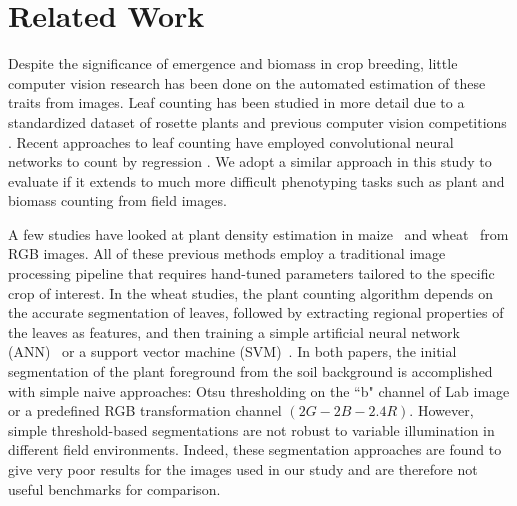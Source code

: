 \documentclass[10pt,twocolumn,letterpaper]{article}
\begin{document}
\section{Related Work}
\label{sec:rw}

Despite the significance of emergence and biomass in crop breeding, little computer vision research has been done on the automated estimation of these traits from images. Leaf counting has been studied in more detail due to a standardized dataset of rosette plants and previous computer vision competitions \cite{lcc-2017}. Recent approaches to leaf counting have employed convolutional neural networks to count by regression \cite{aich-cvppp2017}. We adopt a similar approach in this study to evaluate if it extends to much more difficult phenotyping tasks such as plant and biomass counting from field images.


A few studies have looked at plant density estimation in maize~\cite{steward2001, steward2004, steward2005} and wheat~\cite{wheat-ann-2017, jin2017} from RGB images. All of these previous methods employ a traditional image processing pipeline that requires hand-tuned parameters tailored to the specific crop of interest.
In the wheat studies, the plant counting algorithm depends on the accurate segmentation of leaves, followed by extracting regional properties of the leaves as features, and then training a simple artificial neural network (ANN)~\cite{wheat-ann-2017} or a support vector machine (SVM)~\cite{jin2017}. In both papers, the initial segmentation of the plant foreground from the soil background is accomplished with simple naive approaches: Otsu thresholding on the ``b" channel of Lab image or a predefined RGB transformation channel $(2G-2B-2.4R)$. However, simple threshold-based segmentations are not robust to variable illumination in different field environments. Indeed, these segmentation approaches are found to give very poor results for the images used in our study and are therefore not useful benchmarks for comparison.
\end{document}

